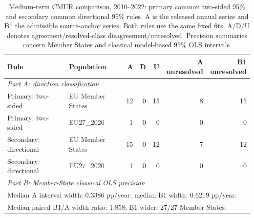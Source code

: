 \begin{table}[htbp]
\centering
\small
\caption{Medium-term CMUR comparison, 2010--2022: primary common two-sided 95\% and secondary common directional 95\% rules. A is the released annual series and B1 the admissible source-anchor series. Both rules use the same fixed fits. A/D/U denotes agreement/resolved-class disagreement/unresolved. Precision summaries concern Member States and classical model-based 95\% OLS intervals.}
\label{tab:mediumterm}
\begin{tabular}{llrrrrr}
\toprule
Rule & Population & A & D & U & \shortstack{A\\unresolved} & \shortstack{B1\\unresolved} \\
\midrule
\multicolumn{7}{l}{\textit{Part A: direction classification}} \\
Primary: two-sided & EU Member States & 12 & 0 & 15 & 8 & 15 \\
Primary: two-sided & EU27\_2020 & 1 & 0 & 0 & 0 & 0 \\
Secondary: directional & EU Member States & 15 & 0 & 12 & 7 & 12 \\
Secondary: directional & EU27\_2020 & 1 & 0 & 0 & 0 & 0 \\
\midrule
\multicolumn{7}{l}{\textit{Part B: Member-State classical OLS precision}} \\
\multicolumn{7}{l}{Median A interval width: 0.3386 pp/year; median B1 width: 0.6219 pp/year.} \\
\multicolumn{7}{l}{Median paired B1/A width ratio: 1.858; B1 wider: 27/27 Member States.} \\
\bottomrule
\end{tabular}
\end{table}
